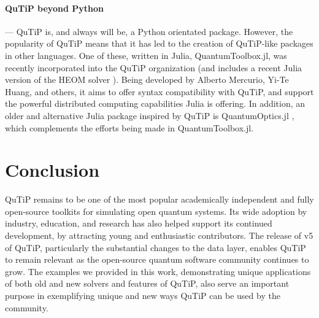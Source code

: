 \documentclass[preprint,3p,sort&compress]{elsarticle}
\begin{document}
\paragraph{QuTiP beyond Python} --- QuTiP is, and always will be, a Python orientated package. However, the popularity of QuTiP means that it has led to the creation of QuTiP-like packages in other languages. One of these, written in Julia, QuantumToolbox.jl, was recently incorporated into the QuTiP organization (and includes a recent Julia version of the HEOM solver \cite{Huang2023}).  Being developed by Alberto Mercurio, Yi-Te Huang, and others, it aims to offer syntax compatibility with QuTiP, and support the powerful distributed computing capabilities Julia is offering. In addition, an older and alternative Julia package inspired by QuTiP is QuantumOptics.jl \cite{kramer2018quantumoptics}, which complements the efforts being made in QuantumToolbox.jl.

\section{Conclusion}

QuTiP remains to be one of the most popular academically independent and fully open-source toolkits for simulating open quantum systems.  Its wide adoption by industry, education, and research has also helped support its continued development, by attracting young and enthusiastic contributors.  The release of v5 of QuTiP, particularly the substantial changes to the data layer, enables QuTiP to remain relevant as the open-source quantum software community continues to grow.  The examples we provided in this work, demonstrating unique applications of both old and new solvers and features of QuTiP, also serve an important purpose in exemplifying unique and new ways QuTiP can be used by the community.
\end{document}

